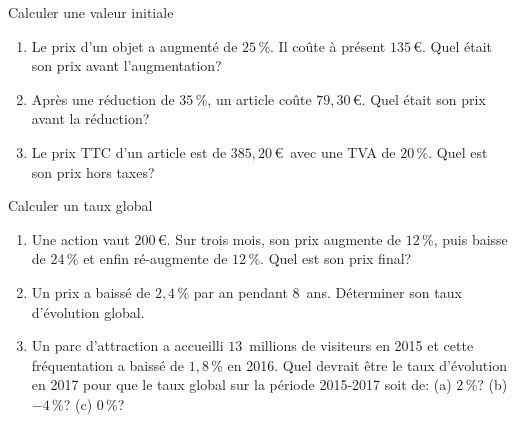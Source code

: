 \documentclass[a4paper, 11pt]{article}
\begin{document}
  \exost Calculer une valeur initiale
  \begin{enumerate}
    \item Le prix d'un objet a augment\'e de $25$\,\%. Il coûte à pr\'esent $135$\,\euro. Quel \'etait son prix avant l'augmentation?
    \item Après une r\'eduction de $35$\,\%, un article coûte $79,30$\,\euro. Quel \'etait son prix avant la r\'eduction?
    \item Le prix TTC d'un article est de $385,20$\,\euro\ avec une TVA de $20$\,\%. Quel est son prix hors taxes?
  \end{enumerate}


\exost Calculer un taux global

  \begin{enumerate}
    \item Une action vaut $200$\,\euro. Sur trois mois, son prix augmente de $12$\,\%, puis baisse de $24$\,\% et enfin r\'e-augmente de $12$\,\%. Quel est son prix final? 
    \item Un prix a baiss\'e de $2,4$\,\% par an pendant $8$~ans. D\'eterminer son taux d'\'evolution global.
    \item Un parc d'attraction a accueilli $13$~millions de visiteurs en 2015 et cette fr\'equentation a baiss\'e de $1,8$\,\% en 2016. Quel devrait être le taux d'\'evolution en 2017 pour que le taux global sur la p\'eriode 2015-2017 soit de: \quad (a) $2$\,\%? \quad (b) $-4$\,\%? \quad (c) $0$\,\%?
  \end{enumerate}

\clearpage
\end{document}
